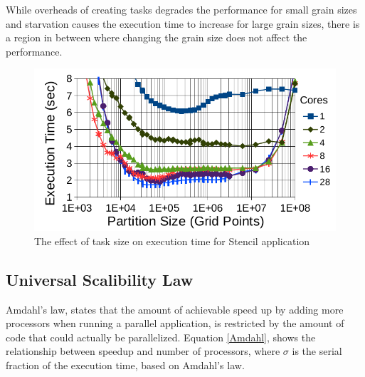 While overheads of creating tasks degrades the performance for small grain sizes and starvation causes the execution time to increase for large grain sizes, there is a region in between where changing the grain size does not affect the performance. 

\begin{figure}[H]
	\centering
	\includegraphics[scale=0.4]{images/task_granularity.png}
	\caption{The effect of task size on execution time for Stencil application \cite{grubel2015performance}}	
	\label{fig_task_gran}
\end{figure}




\vspace{\baselineskip}
\subsection{Universal Scalibility Law}
Amdahl's law\cite{amdahl1967validity}, states that the amount of achievable speed up by adding more processors when running a parallel application, is restricted by the amount of code that could actually be parallelized. 
Equation \ref{Amdahl}, shows the relationship between speedup and number of processors, where $\sigma$ is the serial fraction of the execution time, based on Amdahl's law\cite{gunther2007guerrilla}. 

